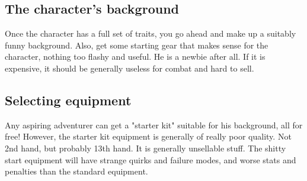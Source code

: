 %
%


\subsection*{The character's background}
Once the character has a full set of traits, you go ahead and make up a suitably funny background. Also, get some starting gear that makes sense for the character, nothing too flashy and useful. He is a newbie after all. If it is expensive, it should be generally useless for combat and hard to sell.


%


\subsection*{Selecting equipment}
Any aspiring adventurer can get a "starter kit" suitable for his background, all for free! However, the starter kit equipment is generally of really poor quality. Not 2nd hand, but probably 13th hand. It is generally unsellable stuff. The shitty start equipment will have strange quirks and failure modes, and worse stats and penalties than the standard equipment.

